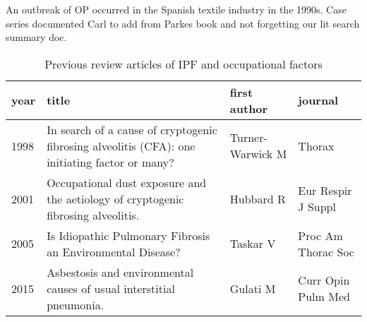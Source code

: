 \documentclass[a4paper,12pt]{article}
\begin{document}
An outbreak of OP occurred in the Spanish textile industry in the 1990s.  Case series documented 
Carl to add from Parkes book and not forgetting our lit search summary doc.




%

\begin{table}
    \begin{tabular}{lp{6cm}ll}
    \textbf{year} & \textbf{title} &       \textbf{first author} &            \textbf{journal} \\
    \midrule
    1998    &  In search of a cause of cryptogenic fibrosing alveolitis (CFA): one initiating factor or many?       &  Turner-Warwick M &              Thorax \\
    2001    &               Occupational dust exposure and the aetiology of cryptogenic fibrosing alveolitis. &         Hubbard R &  Eur Respir J Suppl \\
    2005    &  Is Idiopathic Pulmonary Fibrosis an Environmental Disease?
            &          Taskar V &  Proc Am Thorac Soc \\
    2015    &                            Asbestosis and environmental causes of usual interstitial pneumonia.  &          Gulati M &  Curr Opin Pulm Med \\
    \bottomrule
    \end{tabular}
    \caption{Previous review articles of IPF and occupational factors}
    \label{table:reviews}
\end{table}
\end{document}
